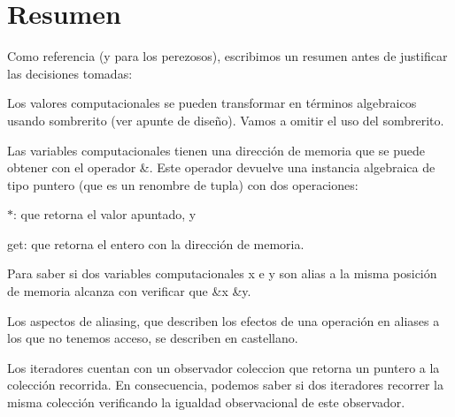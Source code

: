 \hypertarget{Aliasing_sec-Resumen}{}\section{Resumen}\label{Aliasing_sec-Resumen}
Como referencia (y para los perezosos), escribimos un resumen antes de justificar las decisiones tomadas\+:
\begin{DoxyItemize}
\item Los valores computacionales se pueden transformar en términos algebraicos usando sombrerito (ver apunte de diseño). Vamos a omitir el uso del sombrerito.
\item Las variables computacionales tienen una dirección de memoria que se puede obtener con el operador \&. Este operador devuelve una instancia algebraica de tipo puntero (que es un renombre de tupla) con dos operaciones\+:
\begin{DoxyEnumerate}
\item \textquotesingle{}$\ast$\textquotesingle{}\+: que retorna el valor apuntado, y
\item \textquotesingle{}get\textquotesingle{}\+: que retorna el entero con la dirección de memoria.
\end{DoxyEnumerate}
\item Para saber si dos variables computacionales {\ttfamily x} e {\ttfamily y} son alias a la misma posición de memoria alcanza con verificar que \&{\ttfamily x}  \&{\ttfamily y}.
\item Los aspectos de aliasing, que describen los efectos de una operación en aliases a los que no tenemos acceso, se describen en castellano.
\item Los iteradores cuentan con un observador {\ttfamily coleccion} que retorna un puntero a la colección recorrida. En consecuencia, podemos saber si dos iteradores recorrer la misma colección verificando la igualdad observacional de este observador.
\end{DoxyItemize}

